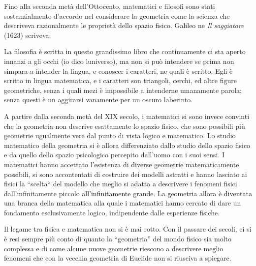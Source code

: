 Fino alla seconda metà dell’Ottocento, matematici e filosofi sono stati sostanzialmente d’accordo nel considerare la geometria come la scienza che descriveva razionalmente le proprietà dello spazio fisico. Galileo ne \emph{Il saggiatore} (1623) scriveva:
\begin{quoting}
La filosofia è scritta in questo grandissimo libro che continuamente ci sta aperto innanzi a gli occhi (io dico l{\textquotesingle}universo), ma non si può intendere se prima non s{\textquotesingle}impara a intender la lingua, e conoscer i caratteri, ne{\textquotesingle} quali è scritto. Egli è scritto in lingua matematica, e i caratteri son triangoli, cerchi, ed altre figure geometriche, senza i quali mezi è impossibile a intenderne umanamente parola; senza questi è un aggirarsi vanamente per un oscuro laberinto.
\end{quoting}
A partire dalla seconda metà del XIX secolo, i matematici si sono invece convinti che la geometria non descrive esattamente lo spazio fisico, che sono possibili più geometrie ugualmente vere dal punto di vista logico e matematico. Lo studio matematico della geometria si è allora differenziato dallo studio dello spazio fisico e da quello dello spazio psicologico percepito dall’uomo con i suoi sensi. I matematici hanno accettato l’esistenza di diverse geometrie matematicamente possibili, si sono accontentati di costruire dei modelli astratti e hanno lasciato ai fisici la “scelta“ del modello che meglio si adatta a descrivere i fenomeni fisici dall’infinitamente piccolo all’infinitamente grande. La geometria allora è diventata una branca della matematica alla quale i matematici hanno cercato di dare un fondamento esclusivamente logico, indipendente dalle esperienze fisiche. 

Il legame tra fisica e matematica non si è mai rotto. Con il passare dei secoli, ci si è resi sempre più conto di quanto la “geometria” del mondo fisico sia molto complessa e di come alcune nuove geometrie riescono a descrivere meglio fenomeni che con la vecchia geometria di Euclide non si riusciva a spiegare.

